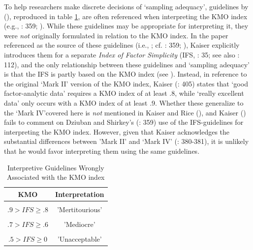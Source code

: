 \documentclass[
  10pt,
  a4paper,
  twoside]{article}
\begin{document}
To help researchers make discrete decisions of `sampling adequacy', guidelines by (), reproduced in table \ref{tab:kmo-interpretive-guidelines-table}, are often referenced when interpreting the KMO index (e.g., : 359; ). While these guidelines may be appropriate for interpreting it, they were \emph{not} originally formulated in relation to the KMO index. In the paper referenced as the source of these guidelines (i.e., ; cf. : 359; ), Kaiser explicitly introduces them for a separate \emph{Index of Factor Simplicity} (IFS, : 35; see also : 112), and the only relationship between these guidelines and `sampling adequacy' is that the IFS is partly based on the KMO index (see ). Instead, in reference to the original `Mark II' version of the KMO index, Kaiser (: 405) states that `good factor-analytic data' requires a KMO index of at least .8, while `really excellent data' only occurs with a KMO index of at least .9. Whether these generalize to the `Mark IV'covered here is \emph{not} mentioned in Kaiser and Rice (), and Kaiser () fails to comment on Dziuban and Shirkey's (: 359) use of the IFS-guidelines for interpreting the KMO index. However, given that Kaiser acknowledges the substantial differences between 'Mark II' and `Mark IV' (: 380-381), it is unlikely that he would favor interpreting them using the same guidelines.

\begin{table}[H]
\centering
\caption{\label{tab:kmo-interpretive-guidelines-table}Interpretive Guidelines Wrongly Associated with the KMO index}
\centering
\begin{tabular}[t]{cc}
\toprule
KMO & Interpretation\\
\midrule
\cellcolor{gray!10}{$1 \geq IFS \geq .9$} & \cellcolor{gray!10}{'Marvelous'}\\
$.9 > IFS \geq .8$ & 'Mertitourious'\\
\cellcolor{gray!10}{$.8 > IFS \geq .7$} & \cellcolor{gray!10}{'Middling'}\\
$.7 > IFS \geq .6$ & 'Mediocre'\\
\cellcolor{gray!10}{$.6 > IFS \geq .5$} & \cellcolor{gray!10}{'Miserable'}\\
\addlinespace
$.5 > IFS \geq 0$ & 'Unacceptable'\\
\bottomrule
\end{tabular}
\end{table}
\vspace{-1.5em}
\begingroup
\setlength{\baselineskip}{1em}
\end{document}
